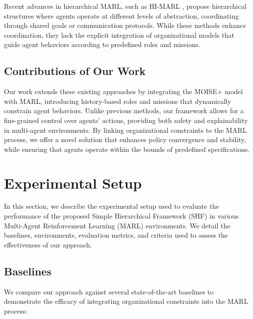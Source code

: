 \documentclass[sigconf,anonymous]{aamas}
\begin{document}
Recent advances in hierarchical MARL, such as HI-MARL \cite{hi_marl_reference}, propose hierarchical structures where agents operate at different levels of abstraction, coordinating through shared goals or communication protocols. While these methods enhance coordination, they lack the explicit integration of organizational models that guide agent behaviors according to predefined roles and missions.

\subsection{Contributions of Our Work}
Our work extends these existing approaches by integrating the MOISE+ model with MARL, introducing history-based roles and missions that dynamically constrain agent behaviors. Unlike previous methods, our framework allows for a fine-grained control over agents' actions, providing both safety and explainability in multi-agent environments. By linking organizational constraints to the MARL process, we offer a novel solution that enhances policy convergence and stability, while ensuring that agents operate within the bounds of predefined specifications.

\section{Experimental Setup}
\label{sec:experimental_setup}

In this section, we describe the experimental setup used to evaluate the performance of the proposed Simple Hierarchical Framework (SHF) in various Multi-Agent Reinforcement Learning (MARL) environments. We detail the baselines, environments, evaluation metrics, and criteria used to assess the effectiveness of our approach.

\subsection{Baselines}
We compare our approach against several state-of-the-art baselines to demonstrate the efficacy of integrating organizational constraints into the MARL process:
\end{document}
